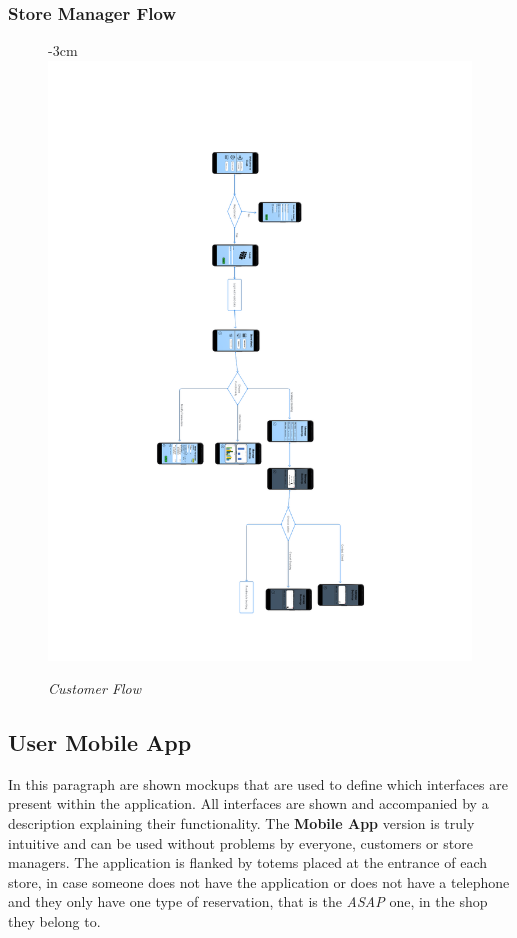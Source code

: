 \documentclass{article}
\begin{document}
		\subsubsection{Store Manager Flow}
		\begin{figure}
			\begin{adjustwidth} {-3cm}{}
				\centering
				\includegraphics[scale=0.7, angle=180, trim= 0 0 0 -5cm]{../Mockups/UXDiagrams/StoreManagerFlow.pdf} \\
			\end{adjustwidth}
			\caption{\emph{Customer Flow}}
		\end{figure}


	\subsection{User Mobile App}
	In this paragraph are shown mockups that are used to define which interfaces are present within the application. All interfaces are shown and accompanied by a description explaining their functionality. The {\bfseries Mobile App} version is truly intuitive and can be used without problems by everyone, customers or store managers. The application is flanked by totems placed at the entrance of each store, in case someone does not have the application or does not have a telephone and they only have one type of reservation, that is the \emph{ASAP} one, in the shop they belong to.
	\newpage
\end{document}
